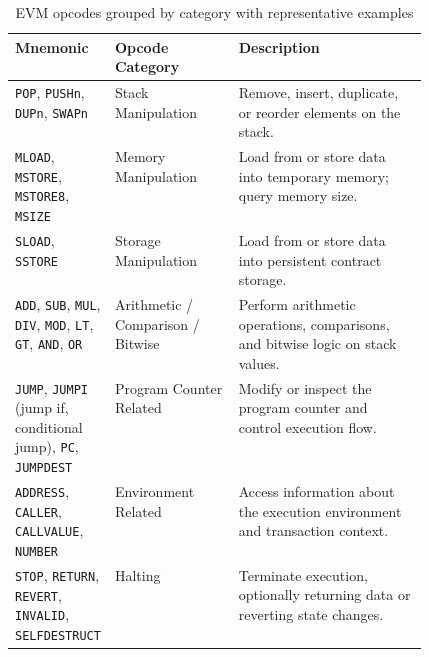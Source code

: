 \documentclass{scrbook}
\begin{document}
\begin{table}[h!]
    \centering
    \begin{tabularx}{\linewidth}{|p{0.18\linewidth}|p{0.30\linewidth}|X|}
        \hline
        \textbf{Mnemonic} & \textbf{Opcode Category} & \textbf{Description} \\ \hline
        
        \texttt{POP}, \texttt{PUSHn}, \texttt{DUPn}, \texttt{SWAPn} 
        & Stack Manipulation 
        & Remove, insert, duplicate, or reorder elements on the stack. \\ \hline
        
        \texttt{MLOAD}, \texttt{MSTORE}, \texttt{MSTORE8}, \texttt{MSIZE} 
        & Memory Manipulation 
        & Load from or store data into temporary memory; query memory size. \\ \hline
        
        \texttt{SLOAD}, \texttt{SSTORE} 
        & Storage Manipulation 
        & Load from or store data into persistent contract storage. \\ \hline
        
        \texttt{ADD}, \texttt{SUB}, \texttt{MUL}, \texttt{DIV}, \texttt{MOD}, \texttt{LT}, \texttt{GT}, \texttt{AND}, \texttt{OR} 
        & Arithmetic / Comparison / Bitwise 
        & Perform arithmetic operations, comparisons, and bitwise logic on stack values. \\ \hline
        
        \texttt{JUMP}, \texttt{JUMPI} (jump if, conditional jump), \texttt{PC}, \texttt{JUMPDEST} 
        & Program Counter Related 
        & Modify or inspect the program counter and control execution flow. \\ \hline
        
        \texttt{ADDRESS}, \texttt{CALLER}, \texttt{CALLVALUE}, \texttt{NUMBER} 
        & Environment Related 
        & Access information about the execution environment and transaction context. \\ \hline
        
        \texttt{STOP}, \texttt{RETURN}, \texttt{REVERT}, \texttt{INVALID}, \texttt{SELFDESTRUCT} 
        & Halting 
        & Terminate execution, optionally returning data or reverting state changes. \\ \hline
        
    \end{tabularx}
    \caption{EVM opcodes grouped by category with representative examples}
    \label{tbl:opcodes}
\end{table}
\end{document}
